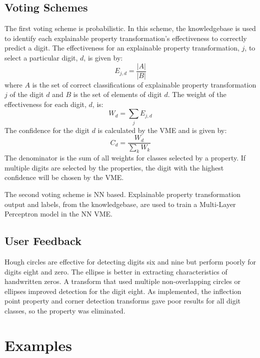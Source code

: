 \documentclass[conference]{IEEEtran}
\begin{document}
\subsection{Voting Schemes}
\label{subsection:Voting}

The first voting scheme is probabilistic.  In this scheme, the knowledgebase is used to identify each explainable property transformation's effectiveness to correctly predict a digit.   The effectiveness for an explainable property transformation, $j$, to select a particular digit, $d$,  is given by:
\begin{equation}\label{effectiveness}
E_{j,d}  = \frac{|A|}{|B|}
\end{equation}
where $A$ is the set of correct classifications of explainable property transformation $j$ of the digit $d$ and $B$ is the set of elements of digit $d$.  The weight of the effectiveness for each digit, $d$, is:
\begin{equation}\label{weight}
W_d=\sum_j E_{j, d}
\end{equation}
The confidence for the digit $d$ is calculated by the VME and is given by:
\begin{equation}\label{conf}
C_d=\frac{W_d}{\sum\limits_kW_k}
\end{equation}
The denominator is the sum of all weights for classes selected by a property.  If multiple digits are selected by the properties, the digit with the highest confidence will be chosen by the VME.

The second voting scheme is NN based.  Explainable property transformation output and labels, from the knowledgebase, are used to train a Multi-Layer Perceptron model in the NN VME.

\subsection{ User Feedback}

Hough circles are effective for detecting digits six and nine but perform poorly for digits eight and zero.  The ellipse is better in extracting characteristics of handwritten zeros.   A transform that used multiple non-overlapping circles or ellipses improved detection for the digit eight.  As implemented, the inflection point property and corner detection transforms gave poor results for all digit classes, so the property was eliminated.

\section{Examples}
\end{document}
